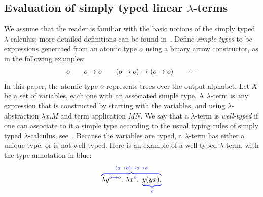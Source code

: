 \subsection{Evaluation of simply typed linear $\lambda$-terms}
\label{sec:one-register}




We assume that the reader is familiar with the basic notions of the simply typed $\lambda$-calculus; more detailed definitions can be found in~\cite{sorensen_lectures_2006}. 
Define  \emph{simple types} to be expressions  generated from an atomic type $o$ using a binary arrow constructor, as in the following examples:
\begin{align*}
    o \qquad o \to o \qquad (o \to o) \to (o \to o) \qquad \cdots 
\end{align*}
In this paper,  the atomic type $o$ represents trees over the output alphabet.
Let $X$ be a set of variables, each one with an associated simple type.  A $\lambda$-term  is any expression that is constructed by starting with the variables, and using $\lambda$-abstraction $\lambda x. M$ and term application $M N$. 
We say that a $\lambda$-term is \emph{well-typed} if one can associate  to it  a simple type according to the usual typing rules of simply typed $\lambda$-calculus,
see~\cite[Definition 3.2.1]{sorensen_lectures_2006}. Because the variables are typed, a  $\lambda$-term has  either a unique type, or is not well-typed.  Here is an example of a well-typed $\lambda$-term, with the type annotation in blue: 
\begin{align*}
    {\color{blue}\overbrace{
        {\color{black}\lambda {y}^{{\color{blue}o\to o}}. \ \lambda {x}^{{\color{blue}o}}.}  \ \underbrace{{\color{black}y (y x).}}_{o}}^{(o\to o) \to o\to o}}
    \end{align*}

    
